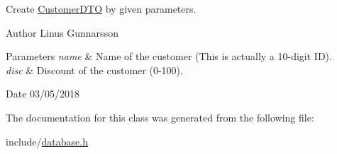 Create \mbox{\hyperlink{classdb_1_1CustomerDTO}{Customer\+D\+TO}} by given parameters. \begin{DoxyAuthor}{Author}
Linus Gunnarsson 
\end{DoxyAuthor}

\begin{DoxyParams}{Parameters}
{\em name} & Name of the customer (This is actually a 10-\/digit ID). \\
\hline
{\em disc} & Discount of the customer (0-\/100). \\
\hline
\end{DoxyParams}
\begin{DoxyDate}{Date}
03/05/2018 
\end{DoxyDate}


The documentation for this class was generated from the following file\+:\begin{DoxyCompactItemize}
\item 
include/\mbox{\hyperlink{database_8h}{database.\+h}}\end{DoxyCompactItemize}
